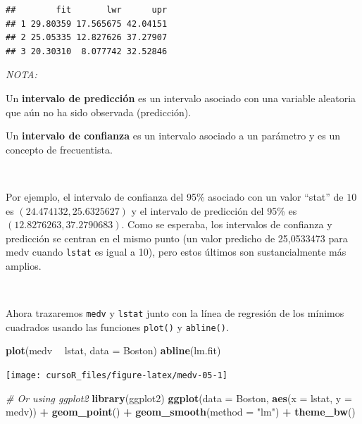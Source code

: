 \documentclass[]{book}
\newenvironment{Shaded}{\begin{snugshade}}{\end{snugshade}}
\newcommand{\KeywordTok}[1]{\textcolor[rgb]{0.13,0.29,0.53}{\textbf{#1}}}
\newcommand{\DataTypeTok}[1]{\textcolor[rgb]{0.13,0.29,0.53}{#1}}
\newcommand{\StringTok}[1]{\textcolor[rgb]{0.31,0.60,0.02}{#1}}
\newcommand{\CommentTok}[1]{\textcolor[rgb]{0.56,0.35,0.01}{\textit{#1}}}
\newcommand{\OperatorTok}[1]{\textcolor[rgb]{0.81,0.36,0.00}{\textbf{#1}}}
\newcommand{\NormalTok}[1]{#1}
\begin{document}
\begin{verbatim}
##        fit       lwr      upr
## 1 29.80359 17.565675 42.04151
## 2 25.05335 12.827626 37.27907
## 3 20.30310  8.077742 32.52846
\end{verbatim}

\emph{NOTA:}

Un \textbf{intervalo de predicción} es un intervalo asociado con una
variable aleatoria que aún no ha sido observada (predicción).

Un \textbf{intervalo de confianza} es un intervalo asociado a un
parámetro y es un concepto de frecuentista.

~

Por ejemplo, el intervalo de confianza del 95\% asociado con un valor
``stat'' de \(10\) es \((24.474132, 25.6325627)\) y el intervalo de
predicción del 95\% es \((12.8276263, 37.2790683)\). Como se esperaba,
los intervalos de confianza y predicción se centran en el mismo punto
(un valor predicho de 25,0533473 para medv cuando \texttt{lstat} es
igual a 10), pero estos últimos son sustancialmente más amplios.

~

Ahora trazaremos \texttt{medv} y \texttt{lstat} junto con la línea de
regresión de los mínimos cuadrados usando las funciones \texttt{plot()}
y \texttt{abline()}.

\begin{Shaded}
\begin{Highlighting}[]
\KeywordTok{plot}\NormalTok{(medv }\OperatorTok{~}\StringTok{ }\NormalTok{lstat, }\DataTypeTok{data =}\NormalTok{ Boston)}
\KeywordTok{abline}\NormalTok{(lm.fit)}
\end{Highlighting}
\end{Shaded}

\begin{center}\texttt{[image: cursoR\_files/figure-latex/medv-05-1]} \end{center}

\begin{Shaded}
\begin{Highlighting}[]
\CommentTok{# Or using ggplot2}
\KeywordTok{library}\NormalTok{(ggplot2)}
\KeywordTok{ggplot}\NormalTok{(}\DataTypeTok{data =}\NormalTok{ Boston, }\KeywordTok{aes}\NormalTok{(}\DataTypeTok{x =}\NormalTok{ lstat, }\DataTypeTok{y =}\NormalTok{ medv)) }\OperatorTok{+}
\StringTok{  }\KeywordTok{geom_point}\NormalTok{() }\OperatorTok{+}\StringTok{ }
\StringTok{  }\KeywordTok{geom_smooth}\NormalTok{(}\DataTypeTok{method =} \StringTok{"lm"}\NormalTok{) }\OperatorTok{+}\StringTok{ }
\StringTok{  }\KeywordTok{theme_bw}\NormalTok{()}
\end{Highlighting}
\end{Shaded}
\end{document}

